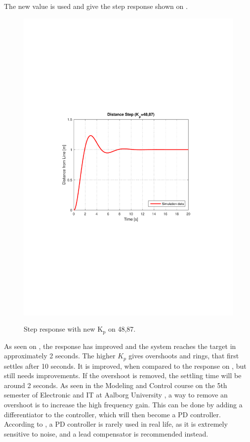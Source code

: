 The new value is used and give the step response shown on .

\begin{figure}[H]
  \centering
  {
    \includegraphics[width=1.4\textwidth]{figures/distanceStep2.pdf}
  }
  \caption{Step response with new $\text{K}_\text{p}$ on 48,87.}
  \label{SimulationSteeringP2}
\end{figure}
As seen on , the response has improved and the system reaches the target in approximately 2 seconds. The higher $K_p$ gives overshoots and rings, that first settles after 10 seconds. It is improved, when compared to the response on , but still needs improvements. If the overshoot is removed, the settling time will be around 2 seconds.
As seen in the Modeling and Control course on the 5th semester of Electronic and IT at Aalborg University \cite{KMNielsen}, a way to remove an overshoot is to increase the high frequency gain. This can be done by adding a differentiator to the controller, which will then become a PD controller. According to \cite{Franklin}, a PD controller is rarely used in real life, as it is extremely sensitive to noise, and a lead compensator is recommended instead.

